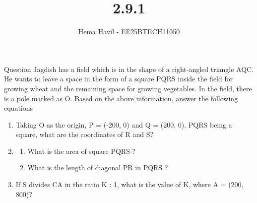 \documentclass{beamer}
\title %
{2.9.1}
\author %
{Hema Havil - EE25BTECH11050}
\begin{document}
	
	\frame{\titlepage}
	\begin{frame}{Question}
		Jagdish has a field which is in the shape of a right-angled triangle AQC. He wants to leave a space in the form of a square PQRS inside the field for growing wheat and the remaining space for growing vegetables. In the field, there is a pole marked as O. Based on the above information, answer the following equations
        \begin{enumerate}[label=\alph*)]
            \item Taking O as the origin, P = (-200, 0) and Q = (200, 0). PQRS being a square, what are the coordinates of R and S?
            \item 
            \begin{enumerate}[label=\roman*)]
                \item What is the area of square PQRS ?
                \item What is the length of diagonal PR in PQRS ?
            \end{enumerate}
            \item If S divides CA in the ratio K : 1, what is the value of K, where A = (200, 800)?
        \end{enumerate}
	\end{frame}
\end{document}
